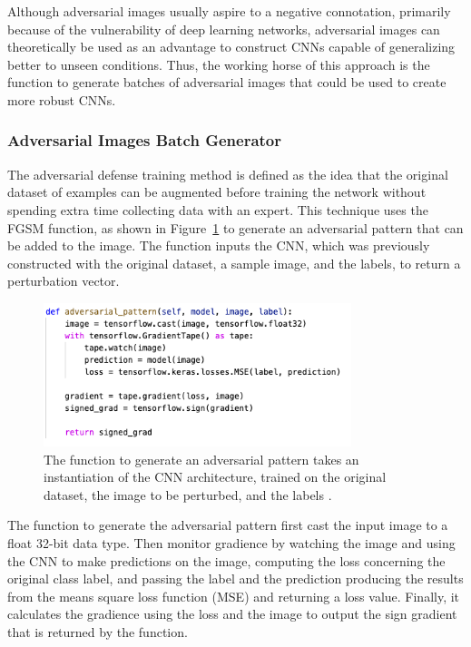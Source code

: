 \documentclass[12pt]{article}
\begin{document}
Although adversarial images usually aspire to a negative connotation, primarily because of the vulnerability of deep learning networks, adversarial images can theoretically be used as an advantage to construct CNNs capable of generalizing better to unseen conditions. Thus, the working horse of this approach is the function to generate batches of adversarial images that could be used to create more robust CNNs. 

\subsubsection{Adversarial Images Batch Generator}

The adversarial defense training method is defined as the idea that the original dataset of examples can be augmented before training the network without spending extra time collecting data with an expert. This technique uses the FGSM function, as shown in Figure~\ref{fig:advpattern} to generate an adversarial pattern that can be added to the image. The function inputs the CNN, which was previously constructed with the original dataset, a sample image, and the labels, to return a perturbation vector.

\begin{figure} [H] %
\begin{center}
\includegraphics[width=0.8\textwidth]{figures/adversarial-pattern.png}
\caption{ The function to generate an adversarial pattern takes an instantiation of the CNN architecture, trained on the original dataset, the image to be perturbed, and the labels \parencite{Rosebrock}. }
\label{fig:advpattern}
\end{center}
\end{figure}

The function to generate the adversarial pattern first cast the input image to a float 32-bit data type. Then monitor gradience by watching the image and using the CNN to make predictions on the image, computing the loss concerning the original class label, and passing the label and the prediction producing the results from the means square loss function (MSE) and returning a loss value. Finally, it calculates the gradience using the loss and the image to output the sign gradient that is returned by the function.
\end{document}
